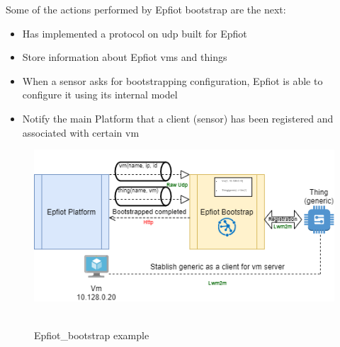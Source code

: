Some of the actions performed by Epfiot bootstrap are the next:
\begin{itemize}
    \item Has implemented a protocol on udp built for Epfiot
    \item Store information about Epfiot vms and things
    \item When a sensor asks for bootstrapping configuration, Epfiot is able to configure it using its internal model
    \item Notify the main Platform that a client (sensor) has been registered and associated with certain vm
\end{itemize}

\begin{figure}[h!]%
\centering
    \includegraphics[width=6.5in]{figures/Epfiot_bootstrap_example.png}
~\caption{Epfiot\_bootstrap example}
\label{figure4.8}
\end{figure}

